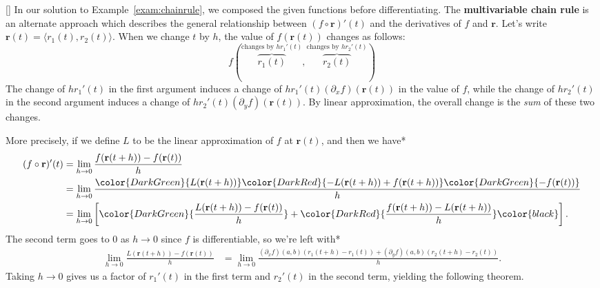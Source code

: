 \documentclass[indent]{watsonbook}
\begin{document}
{\begin{insetfigure}{\usebox{\asybox}}[]
In our solution to Example~\ref{exam:chainrule}, we composed the given functions before differentiating. The \textbf{multivariable chain rule} is an alternate approach which describes the general relationship between $(f\circ \mathbf{r})'(t)$ and the derivatives of $f$ and $\mathbf{r}$. Let's write $\mathbf{r}(t) = \langle r_1(t), r_2(t) \rangle$.  When we change
$t$ by $h$, the value of $f(\mathbf{r}(t))$ changes as follows:
\[
  f\left(
    \overbrace{r_1(t)}^{\text{changes by $hr_1'(t)$}},
    \overbrace{r_2(t)}^{\text{changes by $hr_2'(t)$}}
  \right)
\]
The change of $hr_1'(t)$ in the first argument induces a change of
$hr_1'(t) (\partial_xf)(\mathbf{r}(t))$ in the value of $f$, while
the change of $hr_2'(t)$ in the second argument induces a change of
$hr_2'(t) (\partial_yf)(\mathbf{r}(t))$. By linear approximation,
the overall change is the \textit{sum} of these two changes.
\end{insetfigure}

More precisely, if we define $L$ to be the linear approximation of $f$ at $\mathbf{r}(t)$, and then we have* 
\begin{align*}
  (f\circ \mathbf{r})'(t) &= \lim_{h \to 0} \frac{f(\mathbf{r}(t+h))-f(\mathbf{r}(t))}{h} \\
  &= \lim_{h \to 0} \frac{
    \color{DarkGreen}{L(\mathbf{r}(t+h))}
  \color{DarkRed}{- L(\mathbf{r}(t+h))+f(\mathbf{r}(t+h))}
  \color{DarkGreen}{-f(\mathbf{r}(t))}}{h}\\
  &= \lim_{h \to 0} \left[ \color{DarkGreen}{\frac{L(\mathbf{r}(t+h)) - f(\mathbf{r}(t))}{h}} +
  \color{DarkRed}{\frac{f(\mathbf{r}(t+h))-L(\mathbf{r}(t+h))}{h}} \color{black}\right].
\end{align*}
The second term goes to 0 as $h \to 0$ since $f$ is differentiable, so we're left with* 
\begin{align*}
  \lim_{h \to 0} \frac{L(\mathbf{r}(t+h)) - f(\mathbf{r}(t))}{h} &=
  \lim_{h \to 0} \frac{(\partial_x f)(a,b)(r_1(t+h) - r_1(t)) + (\partial_y f)(a,b)(r_2(t+h) - r_2(t))}{h}.
\end{align*}
Taking $h \to 0$ gives us a factor of $r_1'(t)$ in the first term and $r_2'(t)$ in the second term, yielding the following theorem.

}
\end{document}
